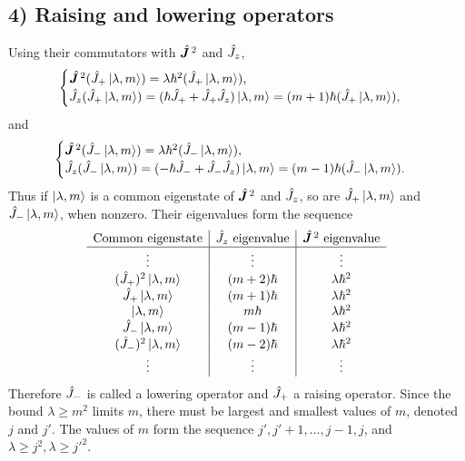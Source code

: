 \subsection*{4) Raising and lowering operators}
Using their commutators with $\hat{\bm{J}}^{\,2}$ and $\hat{J}_z$,
\begin{equation}
\begin{cases}
\hat{\bm{J}}^{\,2}(\hat{J}_+\left|\lambda,m\right\rangle)
=\lambda\hbar^2(\hat{J}_+\left|\lambda,m\right\rangle),\\
\hat{J}_z(\hat{J}_+\left|\lambda,m\right\rangle)
=(\hbar\hat{J}_++\hat{J}_+\hat{J}_z)\left|\lambda,m\right\rangle
=(m+1)\hbar(\hat{J}_+\left|\lambda,m\right\rangle),
\end{cases}
\end{equation}
and
\begin{equation}
\begin{cases}
\hat{\bm{J}}^{\,2}(\hat{J}_-\left|\lambda,m\right\rangle)
=\lambda\hbar^2(\hat{J}_-\left|\lambda,m\right\rangle),\\
\hat{J}_z(\hat{J}_-\left|\lambda,m\right\rangle)
=(-\hbar\hat{J}_-+\hat{J}_-\hat{J}_z)\left|\lambda,m\right\rangle
=(m-1)\hbar(\hat{J}_-\left|\lambda,m\right\rangle).
\end{cases}
\end{equation}
Thus if $\left|\lambda,m\right\rangle$ is a common eigenstate of $\hat{\bm{J}}^{\,2}$ and $\hat{J}_z$, so are $\hat{J}_+\left|\lambda,m\right\rangle$ and $\hat{J}_-\left|\lambda,m\right\rangle$, when nonzero. Their eigenvalues form the sequence
\begin{equation}
\begin{array}{c|c|c}
\text{Common eigenstate}&\hat{J}_z\text{ eigenvalue}&\hat{\bm{J}}^{\,2}\text{ eigenvalue}\\\hline
\vdots&\vdots&\vdots\\
(\hat{J}_+)^2\left|\lambda,m\right\rangle&(m+2)\hbar&\lambda\hbar^2\\
\hat{J}_+\left|\lambda,m\right\rangle&(m+1)\hbar&\lambda\hbar^2\\
\left|\lambda,m\right\rangle&m\hbar&\lambda\hbar^2\\
\hat{J}_-\left|\lambda,m\right\rangle&(m-1)\hbar&\lambda\hbar^2\\
(\hat{J}_-)^2\left|\lambda,m\right\rangle&(m-2)\hbar&\lambda\hbar^2\\
\vdots&\vdots&\vdots
\end{array}
\end{equation}
Therefore $\hat{J}_-$ is called a lowering operator and $\hat{J}_+$ a raising operator. Since the bound $\lambda\ge m^2$ limits $m$, there must be largest and smallest values of $m$, denoted $j$ and $j'$. The values of $m$ form the sequence $j',j'+1,\ldots,j-1,j$, and $\lambda\ge j^2,\lambda\ge j'^2$.

